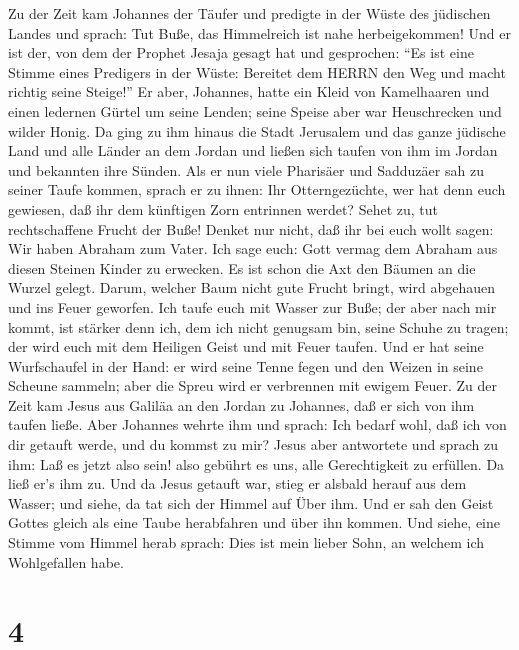  Zu der Zeit kam Johannes der Täufer und predigte in der
Wüste des jüdischen Landes  und sprach: Tut Buße, das
Himmelreich ist nahe herbeigekommen!  Und er ist der, von
dem der Prophet Jesaja gesagt hat und gesprochen: ``Es ist eine Stimme
eines Predigers in der Wüste: Bereitet dem HERRN den Weg und macht
richtig seine Steige!''  Er aber, Johannes, hatte ein Kleid
von Kamelhaaren und einen ledernen Gürtel um seine Lenden; seine Speise
aber war Heuschrecken und wilder Honig.  Da ging zu ihm
hinaus die Stadt Jerusalem und das ganze jüdische Land und alle Länder
an dem Jordan  und ließen sich taufen von ihm im Jordan und
bekannten ihre Sünden.  Als er nun viele Pharisäer und
Sadduzäer sah zu seiner Taufe kommen, sprach er zu ihnen: Ihr
Otterngezüchte, wer hat denn euch gewiesen, daß ihr dem künftigen Zorn
entrinnen werdet?  Sehet zu, tut rechtschaffene Frucht der
Buße!  Denket nur nicht, daß ihr bei euch wollt sagen: Wir
haben Abraham zum Vater. Ich sage euch: Gott vermag dem Abraham aus
diesen Steinen Kinder zu erwecken.  Es ist schon die Axt
den Bäumen an die Wurzel gelegt. Darum, welcher Baum nicht gute Frucht
bringt, wird abgehauen und ins Feuer geworfen.  Ich taufe
euch mit Wasser zur Buße; der aber nach mir kommt, ist stärker denn ich,
dem ich nicht genugsam bin, seine Schuhe zu tragen; der wird euch mit
dem Heiligen Geist und mit Feuer taufen.  Und er hat seine
Wurfschaufel in der Hand: er wird seine Tenne fegen und den Weizen in
seine Scheune sammeln; aber die Spreu wird er verbrennen mit ewigem
Feuer.  Zu der Zeit kam Jesus aus Galiläa an den Jordan zu
Johannes, daß er sich von ihm taufen ließe.  Aber Johannes
wehrte ihm und sprach: Ich bedarf wohl, daß ich von dir getauft werde,
und du kommst zu mir?  Jesus aber antwortete und sprach zu
ihm: Laß es jetzt also sein! also gebührt es uns, alle Gerechtigkeit zu
erfüllen. Da ließ er's ihm zu.  Und da Jesus getauft war,
stieg er alsbald herauf aus dem Wasser; und siehe, da tat sich der
Himmel auf Über ihm. Und er sah den Geist Gottes gleich als eine Taube
herabfahren und über ihn kommen.  Und siehe, eine Stimme
vom Himmel herab sprach: Dies ist mein lieber Sohn, an welchem ich
Wohlgefallen habe.

\hypertarget{section-3}{%
\section{4}\label{section-3}}

